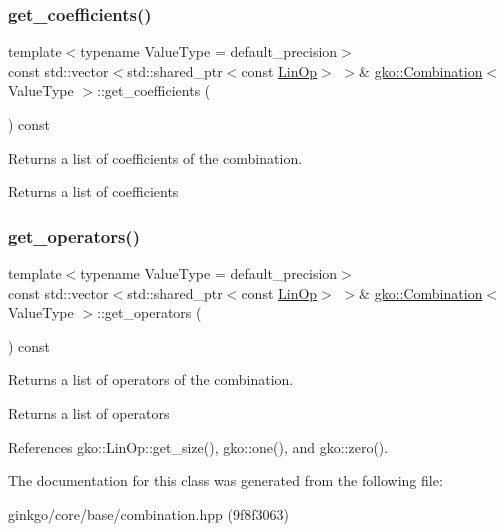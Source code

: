 \subsubsection{\texorpdfstring{get\+\_\+coefficients()}{get\_coefficients()}}
{\footnotesize\ttfamily template$<$typename Value\+Type  = default\+\_\+precision$>$ \\
const std\+::vector$<$std\+::shared\+\_\+ptr$<$const \hyperlink{classgko_1_1LinOp}{Lin\+Op}$>$ $>$\& \hyperlink{classgko_1_1Combination}{gko\+::\+Combination}$<$ Value\+Type $>$\+::get\+\_\+coefficients (\begin{DoxyParamCaption}{ }\end{DoxyParamCaption}) const\hspace{0.3cm}{\ttfamily [noexcept]}}



Returns a list of coefficients of the combination. 

\begin{DoxyReturn}{Returns}
a list of coefficients 
\end{DoxyReturn}
\mbox{\label{classgko_1_1Combination_a75a81c2b91441ddea98949ef54f62441}} 
\subsubsection{\texorpdfstring{get\+\_\+operators()}{get\_operators()}}
{\footnotesize\ttfamily template$<$typename Value\+Type  = default\+\_\+precision$>$ \\
const std\+::vector$<$std\+::shared\+\_\+ptr$<$const \hyperlink{classgko_1_1LinOp}{Lin\+Op}$>$ $>$\& \hyperlink{classgko_1_1Combination}{gko\+::\+Combination}$<$ Value\+Type $>$\+::get\+\_\+operators (\begin{DoxyParamCaption}{ }\end{DoxyParamCaption}) const\hspace{0.3cm}{\ttfamily [noexcept]}}



Returns a list of operators of the combination. 

\begin{DoxyReturn}{Returns}
a list of operators 
\end{DoxyReturn}


References gko\+::\+Lin\+Op\+::get\+\_\+size(), gko\+::one(), and gko\+::zero().



The documentation for this class was generated from the following file\+:\begin{DoxyCompactItemize}
\item 
ginkgo/core/base/combination.\+hpp (9f8f3063)\end{DoxyCompactItemize}
